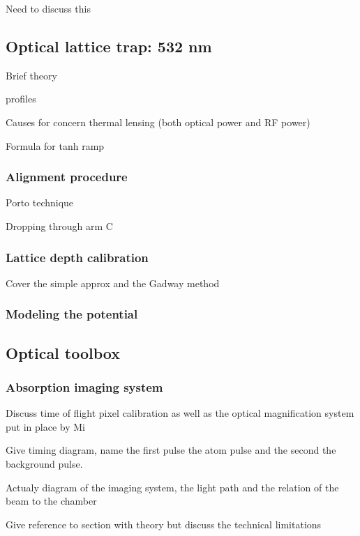 Need to discuss this

\subsection{Optical lattice trap: 532 nm} \label{ssec:532sys}

Brief theory

profiles

Causes for concern
	thermal lensing (both optical power and RF power)
	
Formula for tanh ramp

\subsubsection{Alignment procedure} \label{sssec:532_align}

Porto technique

Dropping through arm C

\subsubsection{Lattice depth calibration} \label{sssec:532_lattice_depth}

Cover the simple approx and the Gadway method

\subsubsection{Modeling the potential} \label{sssec:532_modeling}

\subsection{Optical toolbox}
\label{ssec:op_tools}

\subsubsection{Absorption imaging system}

Discuss time of flight pixel calibration as well as the optical magnification system put in place by Mi

Give timing diagram, name the first pulse the atom pulse and the second the background pulse.

Actualy diagram of the imaging system, the light path and the relation of the beam to the chamber

Give reference to section with theory but discuss the technical limitations
 
